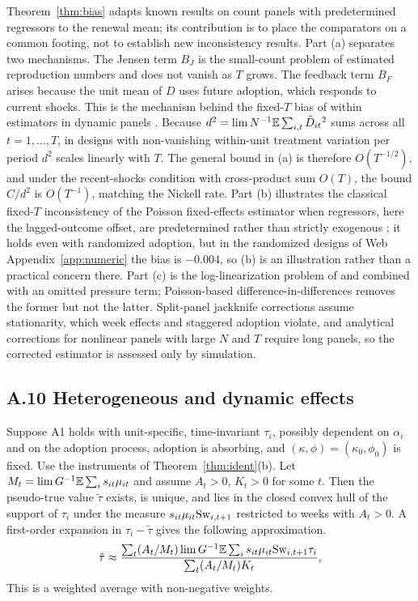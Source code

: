 Theorem~\ref{thm:bias} adapts known results on count panels with predetermined regressors to the
renewal mean; its contribution is to place the comparators on a common footing, not to establish new
inconsistency results. Part (a) separates two mechanisms. The Jensen term $B_J$ is the small-count problem of
estimated reproduction numbers and does not vanish as $T$ grows. The feedback term $B_F$ arises
because the unit mean of $D$ uses future adoption, which responds to current shocks. This is the
mechanism behind the fixed-$T$ bias of within estimators in dynamic panels
\citep{nickell1981biases}. Because $d^2=\lim N^{-1}\mathbb{E}\sum_{i,t}\ddot D_{it}{}^2$ sums across all
$t=1,\dots,T$, in designs with non-vanishing within-unit treatment variation per period $d^2$ scales
linearly with $T$. The general bound in (a) is therefore $O(T^{-1/2})$, and under the recent-shocks
condition with cross-product sum $O(T)$, the bound $C/d^2$ is $O(T^{-1})$, matching the Nickell
rate.
Part (b) illustrates the classical fixed-$T$ inconsistency of the Poisson fixed-effects estimator
\citep{hausman1984count} when regressors, here the lagged-outcome offset, are predetermined rather
than strictly exogenous \citep{wooldridge1997multiplicative,wooldridge1999distribution,blundell2002count};
it holds even with randomized adoption, but in the randomized designs of Web Appendix~\ref{app:numeric}
the bias is $-0.004$, so (b) is an illustration rather than a practical concern there. Part (c) is
the log-linearization problem of \citet{santossilva2006log} and \citet{chen2024logs} combined with
an omitted pressure term; Poisson-based difference-in-differences \citep{wooldridge2023nonlinear}
removes the former but not the latter.
Split-panel jackknife corrections \citep{dhaene2015splitpanel} assume stationarity, which week
effects and staggered adoption violate, and analytical corrections for nonlinear panels with large
$N$ and $T$ \citep{fernandezval2016individual} require long panels, so the corrected estimator is
assessed only by simulation.

\subsection{A.10 Heterogeneous and dynamic effects}
\label{ss:hetero}

\begin{proposition}
\label{prop:hetero}
Suppose A1 holds with unit-specific, time-invariant $\tau_i$, possibly dependent on $\alpha_i$ and
on the adoption process, adoption is absorbing, and $(\kappa,\phi)=(\kappa_0,\phi_0)$ is fixed. Use
the instruments of Theorem~\ref{thm:ident}(b). Let $M_t=\lim G^{-1}\mathbb{E}\sum_i s_{it}\mu_{it}$ and
assume $A_t>0$, $K_t>0$ for some $t$. Then the pseudo-true value $\tilde\tau$ exists, is unique,
and lies in the closed convex hull of the support of $\tau_i$ under the measure
$s_{it}\mu_{it}\mathrm{Sw}_{i,t+1}$ restricted to weeks with $A_t>0$. A first-order expansion in
$\tau_i-\tilde\tau$ gives the following approximation.
\[
\tilde\tau\approx\frac{\sum_t(A_t/M_t)\lim G^{-1}\mathbb{E}\sum_i s_{it}\mu_{it}\mathrm{Sw}_{i,t+1}\tau_i}{\sum_t(A_t/M_t)K_t},
\]
This is a weighted average with non-negative weights.
\end{proposition}

